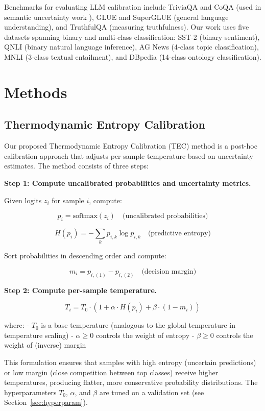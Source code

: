 \documentclass[11pt,letterpaper]{article}
\begin{document}
Benchmarks for evaluating LLM calibration include TriviaQA and CoQA (used in semantic uncertainty work \cite{Kuhn2023}), GLUE and SuperGLUE \cite{Wang2018} (general language understanding), and TruthfulQA \cite{Lin2021} (measuring truthfulness). Our work uses five datasets spanning binary and multi-class classification: SST-2 (binary sentiment), QNLI (binary natural language inference), AG News (4-class topic classification), MNLI (3-class textual entailment), and DBpedia (14-class ontology classification).

\section{Methods}

\subsection{Thermodynamic Entropy Calibration}

Our proposed Thermodynamic Entropy Calibration (TEC) method is a post-hoc calibration approach that adjusts per-sample temperature based on uncertainty estimates. The method consists of three steps:

\textbf{Step 1: Compute uncalibrated probabilities and uncertainty metrics.}

Given logits $z_i$ for sample $i$, compute:

$$p_i = \text{softmax}(z_i) \quad \text{(uncalibrated probabilities)}$$

$$H(p_i) = -\sum_k p_{i,k} \log p_{i,k} \quad \text{(predictive entropy)}$$

Sort probabilities in descending order and compute:

$$m_i = p_{i,(1)} - p_{i,(2)} \quad \text{(decision margin)}$$

\textbf{Step 2: Compute per-sample temperature.}

$$T_i = T_0 \cdot (1 + \alpha \cdot H(p_i) + \beta \cdot (1 - m_i))$$

where:
- $T_0$ is a base temperature (analogous to the global temperature in temperature scaling)
- $\alpha \geq 0$ controls the weight of entropy
- $\beta \geq 0$ controls the weight of (inverse) margin

This formulation ensures that samples with high entropy (uncertain predictions) or low margin (close competition between top classes) receive higher temperatures, producing flatter, more conservative probability distributions. The hyperparameters $T_0$, $\alpha$, and $\beta$ are tuned on a validation set (see Section~\ref{sec:hyperparam}).
\end{document}

